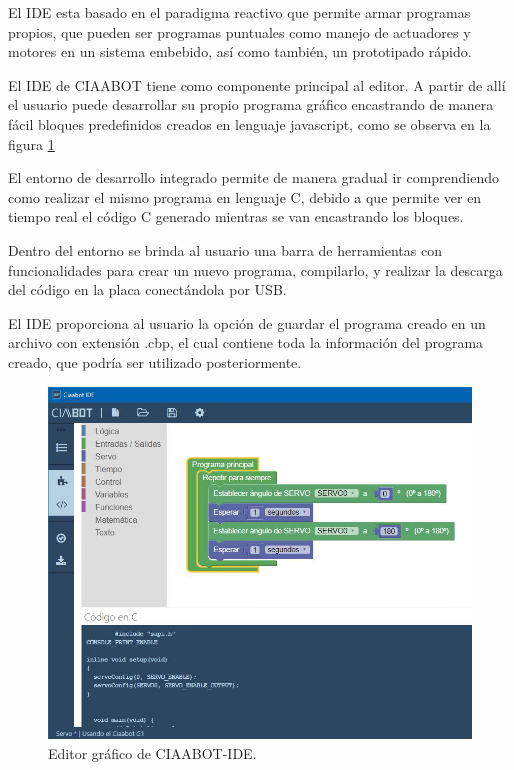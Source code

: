 El IDE esta basado en el paradigma reactivo que permite armar programas propios, que pueden ser programas puntuales como manejo de actuadores y motores
en un sistema embebido, así como también, un prototipado rápido.

El IDE de CIAABOT tiene como componente principal al editor. A partir de allí el usuario puede desarrollar su propio programa gráfico encastrando de manera fácil bloques predefinidos creados en lenguaje javascript, como se observa en la figura \ref{fig:ciaabot-ide-bloques} 

El entorno de desarrollo integrado permite de manera gradual ir comprendiendo como realizar el mismo programa en lenguaje C, debido a que permite ver en tiempo real el código C generado mientras se van encastrando los bloques.

Dentro del entorno se brinda al usuario una barra de herramientas con funcionalidades
para crear un nuevo programa, compilarlo, y realizar la descarga del
código en la placa conectándola por USB.

El IDE proporciona al usuario la opción de guardar el programa creado en un
archivo con extensión .cbp, el cual contiene toda la información del programa
creado, que podría ser utilizado posteriormente. 

\begin{figure}[h]
	\centering
	\includegraphics[scale=.60]{./Figures/ciaabot-ide-bloques.PNG}
	\caption{Editor gráfico de CIAABOT-IDE.}
	\label{fig:ciaabot-ide-bloques}
\end{figure}

